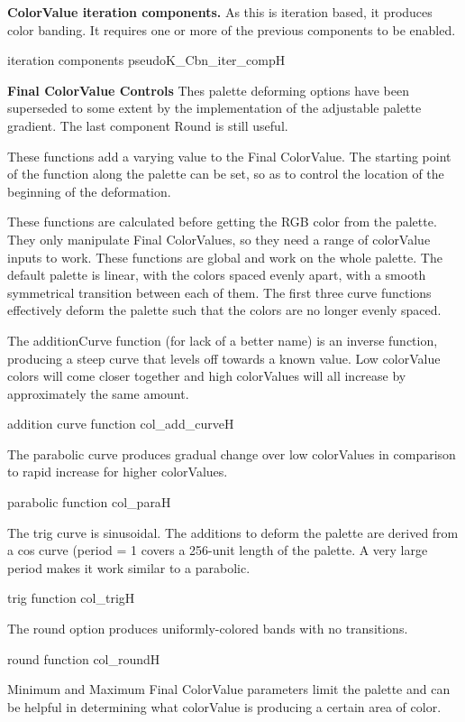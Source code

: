 \textbf{ColorValue iteration components.} As this is iteration based, it produces color banding. It requires one or more of the previous components to be enabled.

{iteration components}
{pseudoK_Cbn_iter_comp}{H}

\textbf{Final ColorValue Controls}
Thes palette deforming options have been superseded to some extent by the implementation of the adjustable palette gradient. The last component Round is still useful.

These functions add a varying value to the Final ColorValue. The starting point of the function along the palette can be set, so as to control the location of the beginning of the deformation.

These functions are calculated before getting the RGB color from the palette. They only manipulate Final ColorValues, so they need a range of colorValue inputs to work. These functions are global and work on the whole palette. The default palette is linear, with the colors spaced evenly apart, with a smooth symmetrical transition between each of them. The first three curve functions effectively deform the palette such that the colors are no longer evenly spaced.

The additionCurve function (for lack of a better name) is an inverse function, producing a steep curve that levels off towards a known value. Low colorValue colors will come closer together and high colorValues will all increase by approximately the same amount.

{addition curve function}
{col_add_curve}{H}

The parabolic curve produces gradual change over low colorValues in comparison to rapid increase for higher colorValues.

{parabolic function}
{col_para}{H}

The trig curve is sinusoidal. The additions to deform the palette are derived from a cos curve (period = 1 covers a 256-unit length of the palette. A very large period makes it work similar to a parabolic.

{trig function}
{col_trig}{H}

The round option produces uniformly-colored bands with no transitions.

{round function}
{col_round}{H}

Minimum and Maximum Final ColorValue parameters limit the palette and can be helpful in determining what colorValue is producing a certain area of color.







